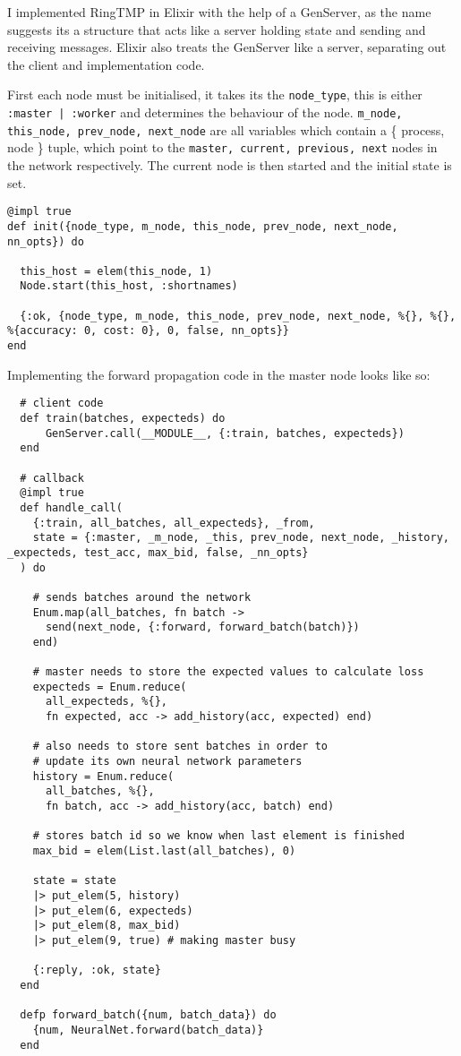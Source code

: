 
I implemented RingTMP in Elixir with the help of a GenServer, as the name
suggests its a structure that acts like a server holding state and sending and
receiving messages. Elixir also treats the GenServer like a server, separating
out the client and implementation code.

First each node must be initialised, it takes its the \lstinline{node_type},
this is either \lstinline{:master | :worker} and determines the behaviour of the
node. \lstinline{m_node, this_node, prev_node, next_node} are all variables which
contain a \{ process, node \} tuple, which point to the 
\lstinline{master, current, previous, next} nodes in the network respectively.
The current node is then started and the initial state is set.
\begin{lstlisting}
@impl true
def init({node_type, m_node, this_node, prev_node, next_node, nn_opts}) do
  
  this_host = elem(this_node, 1)
  Node.start(this_host, :shortnames)
  
  {:ok, {node_type, m_node, this_node, prev_node, next_node, %{}, %{}, %{accuracy: 0, cost: 0}, 0, false, nn_opts}}
end
\end{lstlisting}
\clearpage
Implementing the forward propagation code in the master node looks like so:
\begin{lstlisting}
  # client code
  def train(batches, expecteds) do
      GenServer.call(__MODULE__, {:train, batches, expecteds})
  end

  # callback
  @impl true
  def handle_call(
    {:train, all_batches, all_expecteds}, _from,
    state = {:master, _m_node, _this, prev_node, next_node, _history, _expecteds, test_acc, max_bid, false, _nn_opts}
  ) do

    # sends batches around the network
    Enum.map(all_batches, fn batch ->
      send(next_node, {:forward, forward_batch(batch)})
    end)

    # master needs to store the expected values to calculate loss
    expecteds = Enum.reduce(
      all_expecteds, %{},
      fn expected, acc -> add_history(acc, expected) end)

    # also needs to store sent batches in order to
    # update its own neural network parameters
    history = Enum.reduce(
      all_batches, %{},
      fn batch, acc -> add_history(acc, batch) end)

    # stores batch id so we know when last element is finished
    max_bid = elem(List.last(all_batches), 0)

    state = state
    |> put_elem(5, history)
    |> put_elem(6, expecteds)
    |> put_elem(8, max_bid)
    |> put_elem(9, true) # making master busy

    {:reply, :ok, state}
  end

  defp forward_batch({num, batch_data}) do
    {num, NeuralNet.forward(batch_data)}
  end
\end{lstlisting}
